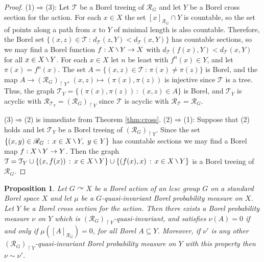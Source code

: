 \documentclass[11pt]{amsart}
\theoremstyle{definition}
\theoremstyle{plain}
\newtheorem{proposition}[definition]{Proposition}
\newcommand{\<}{\langle}
\renewcommand{\>}{\rangle}
\newcommand{\ra}{\rightarrow}
\newcommand{\Tgraph}{\mathcal{T}}
\newcommand\RR{\mathscr{R}}
\newcommand{\mysetminusD}{\hbox{\tikz{\draw[line width=0.6pt,line cap=round] (3pt,0) -- (0,6pt);}}}
\newcommand{\mysetminusT}{\mysetminusD}
\newcommand{\mysetminusS}{\hbox{\tikz{\draw[line width=0.45pt,line cap=round] (2pt,0) -- (0,4pt);}}}
\newcommand{\mysetminusSS}{\hbox{\tikz{\draw[line width=0.4pt,line cap=round] (1.5pt,0) -- (0,3pt);}}}
\newcommand{\mysetminus}{\mathbin{\mathchoice{\mysetminusD}{\mysetminusT}{\mysetminusS}{\mysetminusSS}}}%
\begin{document}
\begin{appendices}
\begin{proof}
(1)$\Rightarrow$(3): Let $\Tgraph$ be a Borel treeing of $\RR_G$ and let $Y$ be a Borel cross section for the action. For each $x\in X$ the set $[x]_{\RR_G} \cap Y$ is countable, so the set of points along a path from $x$ to $Y$ of minimal length is also countable. Therefore, the Borel set $\{ (x,z)\in \Tgraph \, : \, d_{\Tgraph}(z,Y)< d_{\Tgraph}(x,Y) \}$ has countable sections, so we may find a Borel function $f:X\mysetminus Y \ra X$ with $d_{\Tgraph}(f(x),Y) < d_{\Tgraph}(x,Y)$ for all $x\in X\mysetminus Y$. For each $x\in X$ let $n$ be least with $f^n(x)\in Y$, and let $\pi (x) = f^n(x)$. The set $A = \{ (x,z)\in \Tgraph \, : \, \pi (x)\neq \pi (z) \}$ is Borel, and the map $A\ra (\RR_{G})_{\restriction Y}$, $(x,z) \mapsto (\pi (x),\pi (z))$ is injective since $\Tgraph$ is a tree. Thus, the graph $\Tgraph _Y = \{ (\pi (x), \pi (z)) \, : \, (x,z)\in A \}$ is Borel, and $\Tgraph _Y$ is acyclic with $\RR_{\Tgraph _Y}=(\RR_{G})_{\restriction Y}$ since $\Tgraph$ is acyclic with $\RR_{\Tgraph} = \RR_G$.

(3)$\Rightarrow$(2) is immediate from Theorem \ref{thm:cross}. (2)$\Rightarrow$(1): Suppose that (2) holds and let $\Tgraph _Y$ be a Borel treeing of $(\RR_{G})_{\restriction Y}$. Since the set $\{ (x,y)\in \RR_G \, : \, x\in X\mysetminus Y  , \ y\in Y \}$ has countable sections we may find a Borel map $f: X\mysetminus Y \ra Y$. Then the graph $\Tgraph = \Tgraph _Y \cup \{ (x,f(x)) \, : \, x\in X\mysetminus Y \} \cup \{ (f(x),x) \, : \, x\in X\mysetminus Y \}$ is a Borel treeing of $\RR_G$.
\end{proof}

\begin{proposition}\label{prop:Ymeas}
Let $G\curvearrowright X$ be a Borel action of an lcsc group $G$ on a standard Borel space $X$ and let $\mu$ be a $G$-quasi-invariant Borel probability measure on $X$. Let $Y$ be a Borel cross section for the action. Then there exists a Borel probability measure $\nu$ on $Y$ which is $(\RR_{G})_{\restriction Y}$-quasi-invariant, and satisfies $\nu (A) = 0$ if and only if $\mu ([A]_{\RR_G}) = 0$, for all Borel $A\subseteq Y$. Moreover, if $\nu '$ is any other $(\RR_{G})_{\restriction Y}$-quasi-invariant Borel probability measure on $Y$ with this property then $\nu \sim \nu '$.
\end{proposition}


\end{appendices}
\end{document}
